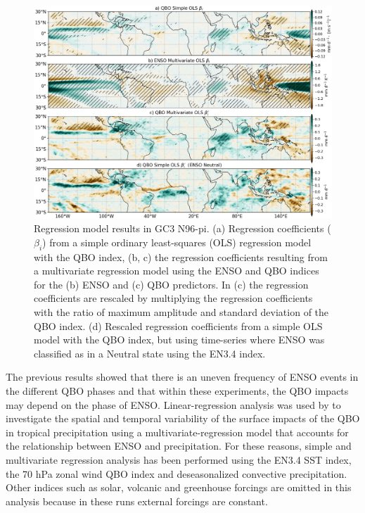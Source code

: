\begin{figure}[t!]
\centering
 \noindent
 \includegraphics[width=\linewidth]{figures/regress_gc3.png}
\caption[Convective precipitation regression analysis]{Regression model results in GC3 N96-pi. (a) Regression coefficients ($\beta_i$) from a simple ordinary least-squares (OLS) regression model with the QBO index, (b, c) the regression coefficients resulting from a multivariate regression model using the ENSO and QBO indices for the (b) ENSO and (c) QBO predictors. In (c) the regression coefficients are rescaled by multiplying the regression coefficients with the ratio of maximum amplitude and standard deviation of the QBO index. (d) Rescaled regression coefficients from a simple OLS model with the QBO index, but using time-series where ENSO was classified as in a Neutral state using the EN3.4 index.  }
\label{fig:enso_regress}
\end{figure}


The previous results showed that there is an uneven frequency of ENSO events in the different QBO phases and that within these experiments, the QBO impacts may depend on the phase of ENSO. 
Linear-regression analysis was used by \cite{gray2018} to investigate the spatial and temporal variability of the surface impacts of the QBO in tropical precipitation using a multivariate-regression model that accounts for the relationship between ENSO and precipitation. 
For these reasons, simple and multivariate regression analysis has been performed using the EN3.4 SST index, the 70 hPa zonal wind QBO index and deseasonalized convective precipitation. Other indices such as solar, volcanic and greenhouse forcings are omitted in this analysis because in these runs external forcings are constant.

